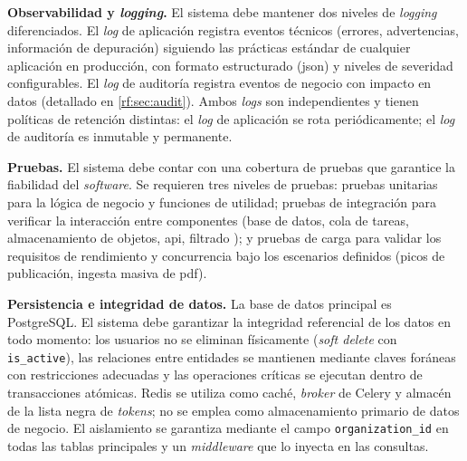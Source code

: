 \item \textbf{Observabilidad y \textit{logging}.} \label{rnf:logging}
El sistema debe mantener dos niveles de \textit{logging} diferenciados. El \textit{log} de
aplicación registra eventos técnicos (errores, advertencias, información de depuración)
siguiendo las prácticas estándar de cualquier aplicación en producción, con formato
estructurado (\acs{json}) y niveles de severidad configurables. El \textit{log} de
auditoría registra eventos de negocio con impacto en datos (detallado en
\cref{rf:sec:audit}). Ambos \textit{logs} son independientes y tienen políticas de
retención distintas: el \textit{log} de aplicación se rota periódicamente; el \textit{log}
de auditoría es inmutable y permanente.

\item \textbf{Pruebas.} \label{rnf:testing}
El sistema debe contar con una cobertura de pruebas que garantice la fiabilidad del
\textit{software}. Se requieren tres niveles de pruebas: pruebas unitarias para la lógica
de negocio y funciones de utilidad; pruebas de integración para verificar la interacción
entre componentes (base de datos, cola de tareas, almacenamiento de objetos, \acs{api},
filtrado ); y pruebas de carga para validar los requisitos de rendimiento
y concurrencia bajo los escenarios definidos (picos de publicación, ingesta masiva de
\acs{pdf}).

\item \textbf{Persistencia e integridad de datos.} \label{rnf:persistence}
La base de datos principal es PostgreSQL. El sistema debe garantizar la integridad
referencial de los datos en todo momento: los usuarios no se eliminan físicamente
(\textit{soft delete} con \texttt{is\_active}), las relaciones entre entidades se mantienen
mediante claves foráneas con restricciones adecuadas y las operaciones críticas se ejecutan
dentro de transacciones atómicas. Redis se utiliza como caché, \textit{broker} de Celery y
almacén de la lista negra de \textit{tokens}; no se emplea como almacenamiento primario de
datos de negocio. El aislamiento  se garantiza mediante el campo
\texttt{organization\_id} en todas las tablas principales y un \textit{middleware} que lo
inyecta en las consultas.

